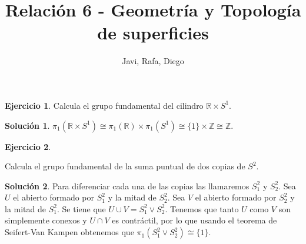 \documentclass{article}
\theoremstyle{plain}
\theoremstyle{definition}
\newtheorem{exercise}{Ejercicio}
\newtheorem*{sol*}{Solución}
\newcommand{\R}{\mathbb{R}}
\newcommand{\Z}{\mathbb{Z}}
\begin{document}
\title{Relación 6 - Geometría y Topología de superficies }
\author{Javi, Rafa, Diego}
\maketitle

\begin{exercise}

Calcula el grupo fundamental del cilindro $\mathbb{R}\times S^1$.

\end{exercise}
\begin{sol*}
$\pi_1(\mathbb{R}\times S^1)\cong\pi_1(\R)\times\pi_1(S^1)\cong\{1\}\times\Z\cong\Z.$
\end{sol*}

\newpage


\begin{exercise}\label{2}

Calcula el grupo fundamental de la suma puntual de dos copias de $S^2$.

\end{exercise}
\begin{sol*}
Para diferenciar cada una de las copias las llamaremos $S^2_1$ y $S^2_2$. Sea $U$ el abierto formado por $S^2_1$ y la mitad de $S^2_2$. Sea $V$ el abierto formado por $S^2_2$ y la mitad de $S^2_1$. Se tiene que $U\cup V=S^2_1\vee S^2_2$. Tenemos que tanto $U$ como $V$ son simplemente conexos y $U\cap V$ es contráctil, por lo que usando el teorema de Seifert-Van Kampen obtenemos que $\pi_1(S^2_1\vee S^2_2)\cong\{1\}$.
\end{sol*}

\newpage
\end{document}
